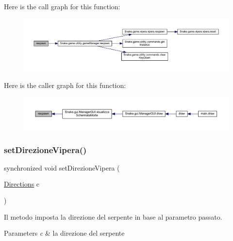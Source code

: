 Here is the call graph for this function\+:
\nopagebreak
\begin{figure}[H]
\begin{center}
\leavevmode
\includegraphics[width=350pt]{class_snake_1_1game_1_1gioco_acfb7d9e73cb8326f2ebf9e9cbfde836a_cgraph}
\end{center}
\end{figure}
Here is the caller graph for this function\+:
\nopagebreak
\begin{figure}[H]
\begin{center}
\leavevmode
\includegraphics[width=350pt]{class_snake_1_1game_1_1gioco_acfb7d9e73cb8326f2ebf9e9cbfde836a_icgraph}
\end{center}
\end{figure}
\mbox{\label{class_snake_1_1game_1_1gioco_ac6bacbb78b013d51f31d65501e08522e}} 
\subsubsection{\texorpdfstring{set\+Direzione\+Vipera()}{setDirezioneVipera()}}
{\footnotesize\ttfamily synchronized void set\+Direzione\+Vipera (\begin{DoxyParamCaption}\item[{\mbox{\hyperlink{enum_snake_1_1game_1_1utility_1_1_directions}{Directions}}}]{c }\end{DoxyParamCaption})}



Il metodo imposta la direzione del serpente in base al parametro passato. 


\begin{DoxyParams}{Parameters}
{\em c} & la direzione del serpente \\
\hline
\end{DoxyParams}


